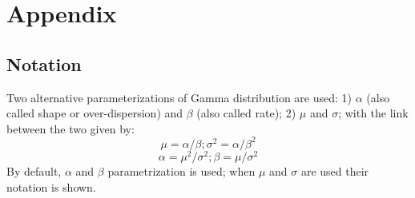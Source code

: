 \documentclass[11pt,a4paper]{article}
\begin{document}
\section{Appendix} \label{Appendix}

\subsection{Notation} \label{Notation}

Two alternative parameterizations of Gamma distribution are used: 1) $\alpha$ (also called shape or over-dispersion) and $\beta$ (also called rate); 2) $\mu$ and $\sigma$; with the link between the two given by:
\begin{equation} \label{eq:gamma_to_mu}
    \mu = \alpha / \beta; \sigma^2 = \alpha / \beta^2
\end{equation}
\begin{equation} \label{eq:gamma_to_alpha}
    \alpha = \mu^2 / \sigma^2; \beta = \mu / \sigma^2
\end{equation}
By default, $\alpha$ and $\beta$ parametrization is used; when $\mu$ and $\sigma$ are used their notation is shown.

\printbibliography
\end{document}
